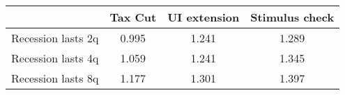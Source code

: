 \begin{tabular}{@{}lccc@{}}
\toprule
& Tax Cut    & UI extension    & Stimulus check    \\  \midrule
Recession lasts 2q &0.995  & 1.241  & 1.289     \\
Recession lasts 4q &1.059  & 1.241  & 1.345     \\
Recession lasts 8q &1.177  & 1.301  & 1.397     \\
\end{tabular}
